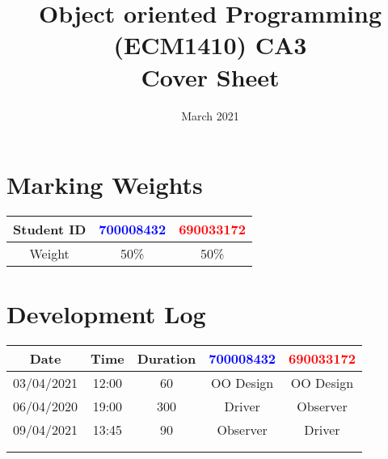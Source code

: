 \documentclass{article}
\title{%
  Object oriented Programming (ECM1410) CA3 \\
  \large Cover Sheet}
\date{March 2021}
\begin{document}
\maketitle

\section{Marking Weights}
\begin{center}
\begin{tabular}{ |c|c|c| } 
 \hline
 Student ID & \textcolor{blue}{700008432} & \textcolor{red}{690033172} \\
 \hline
 Weight & 50\% & 50\% \\
 \hline
\end{tabular}
\end{center}

\section{Development Log}
\begin{tabular}{ |c|c|c|c|c| } 
 \hline
 Date & Time & Duration & \textcolor{blue}{700008432} & \textcolor{red}{690033172} \\
 \hline
 03/04/2021&12:00&60&OO Design&OO Design \\
 \hline
 06/04/2020&19:00&300&Driver&Observer \\
 \hline
 09/04/2021&13:45&90&Observer&Driver \\
 \hline
 &&&& \\
 \hline
 &&&& \\
\end{tabular}
\end{document}

